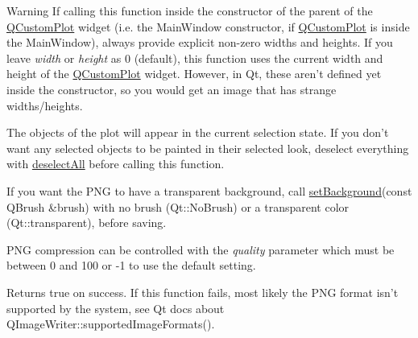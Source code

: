 \begin{DoxyWarning}{\-Warning}
\-If calling this function inside the constructor of the parent of the \hyperlink{classQCustomPlot}{\-Q\-Custom\-Plot} widget (i.\-e. the \-Main\-Window constructor, if \hyperlink{classQCustomPlot}{\-Q\-Custom\-Plot} is inside the \-Main\-Window), always provide explicit non-\/zero widths and heights. \-If you leave {\itshape width\/} or {\itshape height\/} as 0 (default), this function uses the current width and height of the \hyperlink{classQCustomPlot}{\-Q\-Custom\-Plot} widget. \-However, in \-Qt, these aren't defined yet inside the constructor, so you would get an image that has strange widths/heights.
\end{DoxyWarning}
\-The objects of the plot will appear in the current selection state. \-If you don't want any selected objects to be painted in their selected look, deselect everything with \hyperlink{classQCustomPlot_a9d4808ab925b003054085246c92a257c}{deselect\-All} before calling this function.

\-If you want the \-P\-N\-G to have a transparent background, call \hyperlink{classQCustomPlot_a130358592cfca353ff3cf5571b49fb00}{set\-Background}(const \-Q\-Brush \&brush) with no brush (\-Qt\-::\-No\-Brush) or a transparent color (\-Qt\-::transparent), before saving.

\-P\-N\-G compression can be controlled with the {\itshape quality\/} parameter which must be between 0 and 100 or -\/1 to use the default setting.

\-Returns true on success. \-If this function fails, most likely the \-P\-N\-G format isn't supported by the system, see \-Qt docs about \-Q\-Image\-Writer\-::supported\-Image\-Formats().

